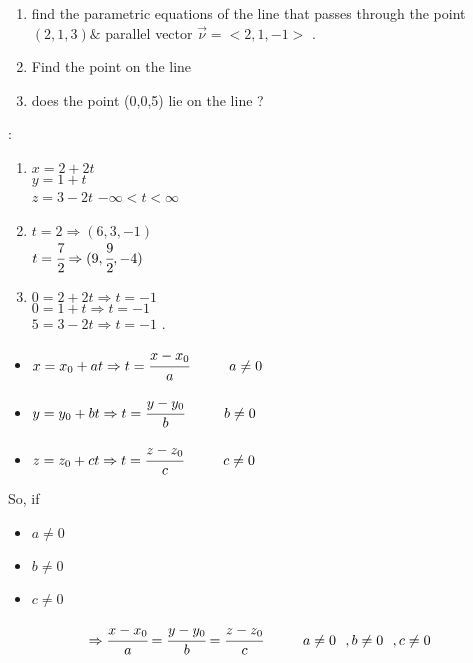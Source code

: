 \begin{example}
 \begin{enumerate}
     \item  find the parametric equations of the line that passes through the point $(2,1,3) \&$ parallel vector $\overrightarrow{\nu} = <2,1,-1>$ .
      \item Find the point on the line
      \item does the point (0,0,5) lie on the line ?
 \end{enumerate}
  {} : 
\begin{enumerate}
    \item $ x = 2 + 2t $\\
 $ y = 1 + t$\\
 $ z = 3 - 2t $ \hspace{1cm}
 $ -\infty < t < \infty$
 \item $ t = 2 \Rightarrow (6,3,-1) $\\
 $ t = \cfrac{7}{2} \Rightarrow (9,\cfrac{9}{2} , -4)$
 \item $ 0 = 2+2t \Rightarrow t =-1 $\\
 $ 0=1+t \Rightarrow t=-1 $\\
 $ 5=3-2t \Rightarrow t=-1 $ \hspace{1cm} {\color{smalt(darkpowderblue)}{yes}}.
\end{enumerate}
\end{example} 
\noindent{\color{smalt(darkpowderblue)}\rule{\linewidth}{.2mm}}
\begin{itemize}
    \item  $ x = x_0 +at \Rightarrow t = \cfrac{x - x_0}{a} \hspace{1cm }a \neq 0 $
    \item  $ y = y_0 +bt \Rightarrow t = \cfrac{y - y_0}{b} \hspace{1cm }b \neq 0 $
    \item  $ z = z_0 +ct \Rightarrow t = \cfrac{z - z_0}{c} \hspace{1cm }c \neq 0 $
\end{itemize}
 So, if
 \begin{itemize}
     \item $ a\neq 0$
     \item $ b\neq 0$
     \item $c\neq 0$ 
 \end{itemize}
 $$ \Rightarrow
  \cfrac{x-x_0}{a} = \cfrac{y-y_0}{b} = \cfrac{z-z_0}{c}
 \hspace{1cm} a\neq 0 ~~ , b\neq 0 ~~ , c\neq 0 $$
